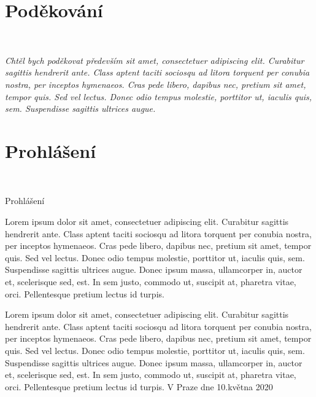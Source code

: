 \documentclass[a4paper,czech,unicode,twoside]{book}[2019/12/20]
\makeatletter
\def\frontchapterfont{\Large \bfseries}
\newcommand{\frontchapternotprinted}[1]{%
  \begingroup
  \let\@makechapterhead\@gobble %
  \let\cleardoublepage\clearpage
  \chapter{#1}
  \endgroup
}
\theoremstyle{plain}
\theoremstyle{definition}
\theoremstyle{remark}
\numberwithin{theorem}{chapter}
\newenvironment{prohlaseni}{
  {{\frontchapterfont\begin{flushright}{\color{heading}Prohlášení}\end{flushright}}}%
  \bigskip
  \noindent\ignorespaces}
\makeatother
\begin{document}
\tableofcontents
\listoffigures
\begingroup
\let\clearpage\relax
\listoftables
\lstlistoflistings
\endgroup

\frontchapternotprinted{Poděkování}
~
\vfill
\hskip 0cm \begin{minipage}{0.7\textwidth}
\textit{Chtěl bych poděkovat především sit amet, consectetuer adipiscing elit. Curabitur sagittis hendrerit ante. Class aptent taciti sociosqu ad litora torquent per conubia nostra, per inceptos hymenaeos. Cras pede libero, dapibus nec, pretium sit amet, tempor quis. Sed vel lectus. Donec odio tempus molestie, porttitor ut, iaculis quis, sem. Suspendisse sagittis ultrices augue.}
\end{minipage}

\vfill

\vfill



\frontchapternotprinted{Prohlášení}
~
\vfill
\begin{prohlaseni}
Lorem ipsum dolor sit amet, consectetuer adipiscing elit. Curabitur sagittis hendrerit ante. Class aptent taciti sociosqu ad litora torquent per conubia nostra, per inceptos hymenaeos. Cras pede libero, dapibus nec, pretium sit amet, tempor quis. Sed vel lectus. Donec odio tempus molestie, porttitor ut, iaculis quis, sem. Suspendisse sagittis ultrices augue. Donec ipsum massa, ullamcorper in, auctor et, scelerisque sed, est. In sem justo, commodo ut, suscipit at, pharetra vitae, orci. Pellentesque pretium lectus id turpis.

Lorem ipsum dolor sit amet, consectetuer adipiscing elit. Curabitur sagittis hendrerit ante. Class aptent taciti sociosqu ad litora torquent per conubia nostra, per inceptos hymenaeos. Cras pede libero, dapibus nec, pretium sit amet, tempor quis. Sed vel lectus. Donec odio tempus molestie, porttitor ut, iaculis quis, sem. Suspendisse sagittis ultrices augue. Donec ipsum massa, ullamcorper in, auctor et, scelerisque sed, est. In sem justo, commodo ut, suscipit at, pharetra vitae, orci. Pellentesque pretium lectus id turpis.
\vskip 1cm
\noindent
V Praze dne 10.\;května 2020 \hspace{.3\textwidth} \dotfill
\end{prohlaseni}
\end{document}
